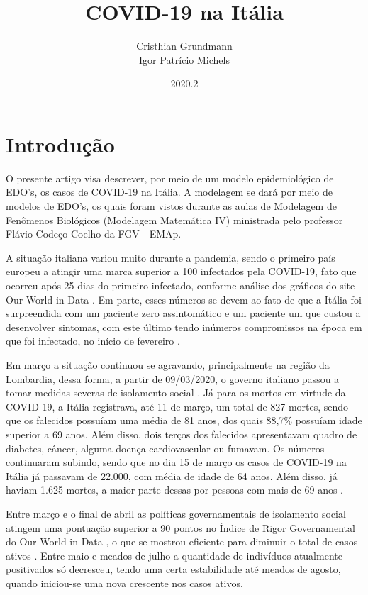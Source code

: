 \documentclass{article}
\title{COVID-19 na Itália}
\author{Cristhian Grundmann \\
Igor Patrício Michels}
\date{2020.2}
\begin{document}
\maketitle

\section{Introdução}

O presente artigo visa descrever, por meio de um modelo epidemiológico de EDO's, os casos de COVID-19 na Itália. A modelagem se dará por meio de modelos de EDO's, os quais foram vistos durante as aulas de Modelagem de Fenômenos Biológicos (Modelagem Matemática IV) ministrada pelo professor Flávio Codeço Coelho da FGV - EMAp.

A situação italiana variou muito durante a pandemia, sendo o primeiro país europeu a atingir uma marca superior a 100 infectados pela COVID-19, fato que ocorreu após 25 dias do primeiro infectado, conforme análise dos gráficos do site Our World in Data \cite{owid}. Em parte, esses números se devem ao fato de que a Itália foi surpreendida com um paciente zero assintomático e um paciente um que custou a desenvolver sintomas, com este último tendo inúmeros compromissos na época em que foi infectado, no início de fevereiro \cite{dn}\cite{cm}.

Em março a situação continuou se agravando, principalmente na região da Lombardia, dessa forma, a partir de 09/03/2020, o governo italiano passou a tomar medidas severas de isolamento social \cite{piccolomini}. Já para os mortos em virtude da COVID-19, a Itália registrava, até 11 de março, um total de 827 mortes, sendo que os falecidos possuíam uma média de 81 anos, dos quais 88,7\% possuíam idade superior a 69 anos. Além disso, dois terços dos falecidos apresentavam quadro de diabetes, câncer, alguma doença cardiovascular ou fumavam. Os números continuaram subindo, sendo que no dia 15 de março os casos de COVID-19 na Itália já passavam de 22.000, com média de idade de 64 anos. Além disso, já haviam 1.625 mortes, a maior parte dessas por pessoas com mais de 69 anos \cite{REMUZZI20201225}\cite{10.1001/jama.2020.4344}.

Entre março e o final de abril as políticas governamentais de isolamento social atingem uma pontuação superior a 90 pontos no Índice de Rigor Governamental do Our World in Data \cite{owid}, o que se mostrou eficiente para diminuir o total de casos ativos \cite{italia}. Entre maio e meados de julho a quantidade de indivíduos atualmente positivados só decresceu, tendo uma certa estabilidade até meados de agosto, quando iniciou-se uma nova crescente nos casos ativos.
\end{document}
